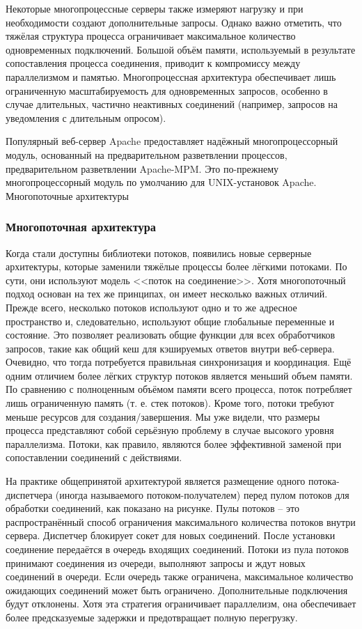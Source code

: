 Некоторые многопроцессные серверы также измеряют нагрузку и при необходимости создают дополнительные запросы. Однако важно отметить, что тяжёлая структура процесса ограничивает максимальное количество одновременных подключений. Большой объём памяти, используемый в результате сопоставления процесса соединения, приводит к компромиссу между параллелизмом и памятью. Многопроцессная архитектура обеспечивает лишь ограниченную масштабируемость для одновременных запросов, особенно в случае длительных, частично неактивных соединений (например, запросов на уведомления с длительным опросом).

Популярный веб-сервер Apache предоставляет надёжный многопроцессорный модуль, основанный на предварительном разветвлении процессов, предварительном разветвлении Apache-MPM. Это по-прежнему многопроцессорный модуль по умолчанию для UNIX-установок Apache.
Многопоточные архитектуры

\subsubsection{Многопоточная архитектура}

Когда стали доступны библиотеки потоков, появились новые серверные архитектуры, которые заменили тяжёлые процессы более лёгкими потоками. По сути, они используют модель <<поток на соединение>>. Хотя многопоточный подход основан на тех же принципах, он имеет несколько важных отличий. Прежде всего, несколько потоков используют одно и то же адресное пространство и, следовательно, используют общие глобальные переменные и состояние. Это позволяет реализовать общие функции для всех обработчиков запросов, такие как общий кеш для кэшируемых ответов внутри веб-сервера. Очевидно, что тогда потребуется правильная синхронизация и координация. Ещё одним отличием более лёгких структур потоков является меньший объем памяти. По сравнению с полноценным объёмом памяти всего процесса, поток потребляет лишь ограниченную память (т. е. стек потоков). Кроме того, потоки требуют меньше ресурсов для создания/завершения. Мы уже видели, что размеры процесса представляют собой серьёзную проблему в случае высокого уровня параллелизма. Потоки, как правило, являются более эффективной заменой при сопоставлении соединений с действиями.

На практике общепринятой архитектурой является размещение одного потока-диспетчера (иногда называемого потоком-получателем) перед пулом потоков для обработки соединений, как показано на рисунке. Пулы потоков -- это распространённый способ ограничения максимального количества потоков внутри сервера. Диспетчер блокирует сокет для новых соединений. После установки соединение передаётся в очередь входящих соединений. Потоки из пула потоков принимают соединения из очереди, выполняют запросы и ждут новых соединений в очереди. Если очередь также ограничена, максимальное количество ожидающих соединений может быть ограничено. Дополнительные подключения будут отклонены. Хотя эта стратегия ограничивает параллелизм, она обеспечивает более предсказуемые задержки и предотвращает полную перегрузку.

